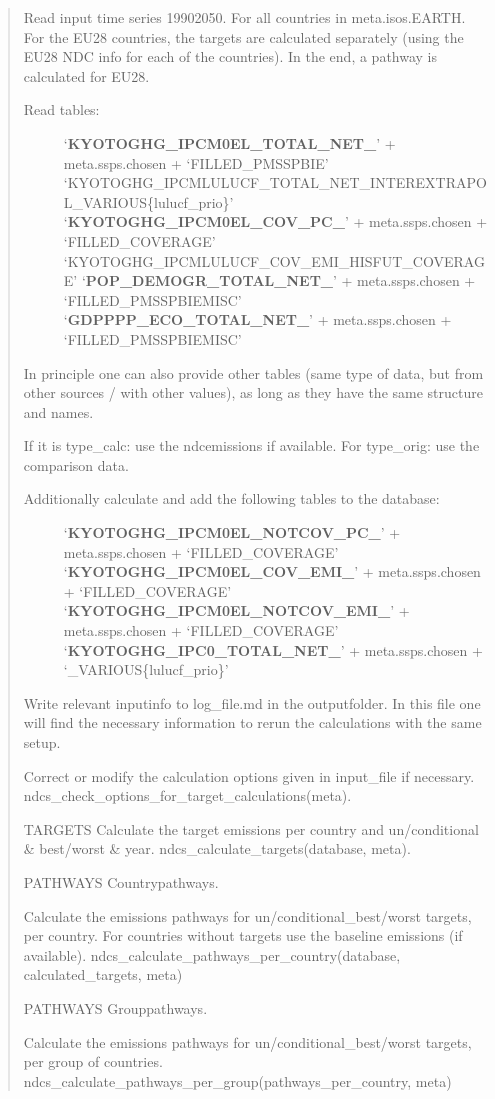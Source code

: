 \documentclass[letterpaper,10pt,english]{sphinxmanual}
\begin{document}
\begin{quote}
Read input time series 1990\sphinxhyphen{}2050. For all countries in meta.isos.EARTH.
For the EU28 countries, the targets are calculated separately (using the EU28 NDC info for each of the countries).
In the end, a pathway is calculated for EU28.
\begin{description}
\item[{Read tables:}] \leavevmode
‘{\color{red}\bfseries{}KYOTOGHG\_IPCM0EL\_TOTAL\_NET\_}’ + meta.ssps.chosen + ‘FILLED\_PMSSPBIE’
‘KYOTOGHG\_IPCMLULUCF\_TOTAL\_NET\_INTEREXTRAPOL\_VARIOUS\{lulucf\_prio\}’
‘{\color{red}\bfseries{}KYOTOGHG\_IPCM0EL\_COV\_PC\_}’ + meta.ssps.chosen + ‘FILLED\_COVERAGE’
‘KYOTOGHG\_IPCMLULUCF\_COV\_EMI\_HISFUT\_COVERAGE’
‘{\color{red}\bfseries{}POP\_DEMOGR\_TOTAL\_NET\_}’ + meta.ssps.chosen + ‘FILLED\_PMSSPBIEMISC’
‘{\color{red}\bfseries{}GDPPPP\_ECO\_TOTAL\_NET\_}’ + meta.ssps.chosen + ‘FILLED\_PMSSPBIEMISC’

\end{description}

In principle one can also provide other tables (same type of data, but from other sources / with other values),
as long as they have the same structure and names.

If it is type\_calc: use the ndc\sphinxhyphen{}emissions if available.
For type\_orig: use the comparison data.
\begin{description}
\item[{Additionally calculate and add the following tables to the database:}] \leavevmode
‘{\color{red}\bfseries{}KYOTOGHG\_IPCM0EL\_NOTCOV\_PC\_}’ + meta.ssps.chosen + ‘FILLED\_COVERAGE’
‘{\color{red}\bfseries{}KYOTOGHG\_IPCM0EL\_COV\_EMI\_}’ + meta.ssps.chosen + ‘FILLED\_COVERAGE’
‘{\color{red}\bfseries{}KYOTOGHG\_IPCM0EL\_NOTCOV\_EMI\_}’ + meta.ssps.chosen + ‘FILLED\_COVERAGE’
‘{\color{red}\bfseries{}KYOTOGHG\_IPC0\_TOTAL\_NET\_}’ + meta.ssps.chosen + ‘\_VARIOUS\{lulucf\_prio\}’

\end{description}

Write relevant input\sphinxhyphen{}info to log\_file.md in the output\sphinxhyphen{}folder.
In this file one will find the necessary information to re\sphinxhyphen{}run the calculations with the same setup.

Correct or modify the calculation options given in input\_file if necessary.
ndcs\_check\_options\_for\_target\_calculations(meta).

TARGETS
Calculate the target emissions per country and un/conditional \& best/worst \& year.
ndcs\_calculate\_targets(database, meta).

PATHWAYS
Country\sphinxhyphen{}pathways.

Calculate the emissions pathways for un/conditional\_best/worst targets, per country.
For countries without targets use the baseline emissions (if available).
ndcs\_calculate\_pathways\_per\_country(database, calculated\_targets, meta)

PATHWAYS
Group\sphinxhyphen{}pathways.

Calculate the emissions pathways for un/conditional\_best/worst targets, per group of countries.
ndcs\_calculate\_pathways\_per\_group(pathways\_per\_country, meta)
\end{quote}
\end{document}
